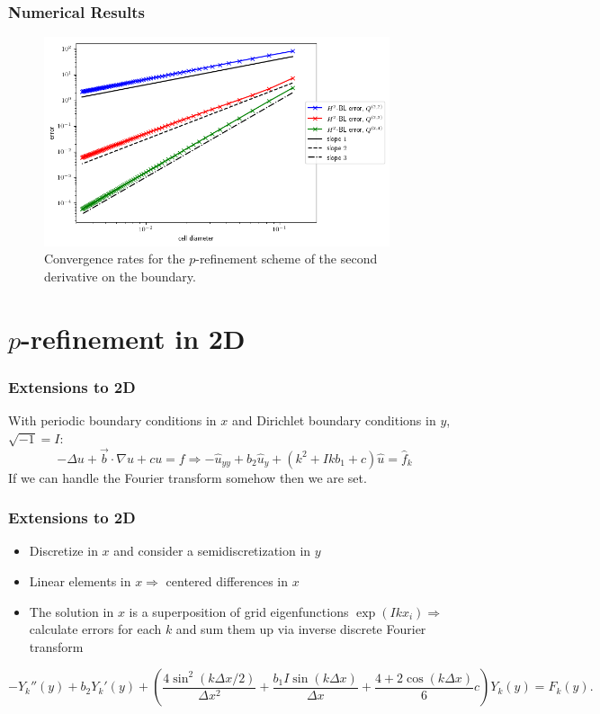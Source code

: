 \documentclass[8pt]{beamer}
\newcommand{\I}{I}
\begin{document}
\begin{frame}
    \frametitle{Numerical Results}
    \begin{figure}
        \centering
        \includegraphics[width=4in]{Pictures/oned-cdr-2-h2-errors.png}

        \caption{Convergence rates for the \(p\)-refinement scheme of the second
        derivative on the boundary.}
    \end{figure}
\end{frame}

\section{\(p\)-refinement in 2D}
\begin{frame}
    \frametitle{Extensions to 2D}
    With periodic boundary conditions in \(x\) and Dirichlet boundary conditions
    in \(y\), \(\sqrt{-1} = I\):
    \begin{equation*}
        -\Delta u + \vec{b}\cdot\nabla u + c u = f
        \Rightarrow
        -\hat{u}_{yy} + b_2 \hat{u}_y + (k^2 + I k b_1 + c) \hat{u} = \hat{f}_k
    \end{equation*}
    If we can handle the Fourier transform somehow then we are set.
\end{frame}

\begin{frame}
    \frametitle{Extensions to 2D}
    \begin{itemize}
        \item Discretize in \(x\) and consider a semidiscretization in \(y\)
        \item Linear elements in \(x \Rightarrow\) centered differences in \(x\)
        \item The solution in \(x\) is a superposition of grid eigenfunctions
              \(\exp(I k x_i) \Rightarrow\) calculate errors for each \(k\) and
              sum them up via inverse discrete Fourier transform
    \end{itemize}
    \pause
    \vspace{0.25in}
    \begin{equation*}
        -Y_k''(y)
        + b_2 Y_k'(y)
        +
        \left(
        \dfrac{4 \sin^2(k \Delta x/2)}{\Delta x^2}
        + \dfrac{b_1 \I \sin(k \Delta x)}{\Delta x}
        + \dfrac{4 + 2 \cos(k \Delta x)}{6} c
        \right) Y_k(y)
        = F_k(y).
    \end{equation*}
\end{frame}
\end{document}
